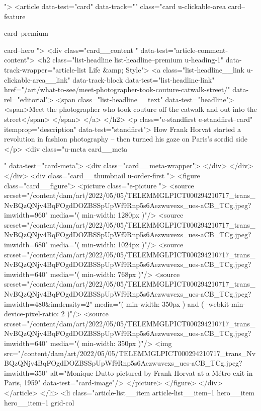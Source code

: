 {{{			
			
			
			
			
			">
<article data-test="card" data-track="" class="card
			u-clickable-area
			card--feature
			
			card--premium
			
			
			
			
			card--hero
			 ">
<div class="card__content " data-test="article-comment-content">
<h2 class="list-headline list-headline--premium u-heading-1" data-track-wrapper="article-list Life &amp; Style">
<a class="list-headline__link u-clickable-area__link" data-track-block data-test="list-headline-link" href="/art/what-to-see/meet-photographer-took-couture-catwalk-street/" data-rel="editorial">
<span class="list-headline__text" data-test="headline">
<span>Meet the photographer who took couture off the catwalk and out into the street</span>
</span>
</a>
</h2>
<p class="e-standfirst  e-standfirst--card" itemprop="description" data-test="standfirst">
How Frank Horvat started a revolution in fashion photography – then turned his gaze on Paris’s sordid side
</p>
<div class="u-meta card__meta
						
						
						" data-test="card-meta">
<div class="card__meta-wrapper">
</div>
</div>
</div>
<div class="card__thumbnail u-order-first ">
<figure class="card__figure">
<picture class="e-picture   ">
<source srcset="/content/dam/art/2022/05/05/TELEMMGLPICT000294210717_trans_NvBQzQNjv4BqFOgdDOZBSSpUpWf9Rnp5s6Aezwuvexs_ues-aCB_TCg.jpeg?imwidth=960" media="( min-width: 1280px )"/>
<source srcset="/content/dam/art/2022/05/05/TELEMMGLPICT000294210717_trans_NvBQzQNjv4BqFOgdDOZBSSpUpWf9Rnp5s6Aezwuvexs_ues-aCB_TCg.jpeg?imwidth=680" media="( min-width: 1024px )"/>
<source srcset="/content/dam/art/2022/05/05/TELEMMGLPICT000294210717_trans_NvBQzQNjv4BqFOgdDOZBSSpUpWf9Rnp5s6Aezwuvexs_ues-aCB_TCg.jpeg?imwidth=640" media="( min-width: 768px )"/>
<source srcset="/content/dam/art/2022/05/05/TELEMMGLPICT000294210717_trans_NvBQzQNjv4BqFOgdDOZBSSpUpWf9Rnp5s6Aezwuvexs_ues-aCB_TCg.jpeg?imwidth=480&imdensity=2" media="( min-width: 350px ) and ( -webkit-min-device-pixel-ratio: 2 )"/>
<source srcset="/content/dam/art/2022/05/05/TELEMMGLPICT000294210717_trans_NvBQzQNjv4BqFOgdDOZBSSpUpWf9Rnp5s6Aezwuvexs_ues-aCB_TCg.jpeg?imwidth=640" media="( min-width: 350px )"/>
<img src="/content/dam/art/2022/05/05/TELEMMGLPICT000294210717_trans_NvBQzQNjv4BqFOgdDOZBSSpUpWf9Rnp5s6Aezwuvexs_ues-aCB_TCg.jpeg?imwidth=350" alt="Monique Dutto pictured by Frank Horvat at a Métro exit in Paris, 1959" data-test="card-image"/>
</picture>
</figure>
</div>
</article>
</li>
<li class="article-list__item article-list__item--1 hero__item hero__item--1
			grid-col
			
}}}
